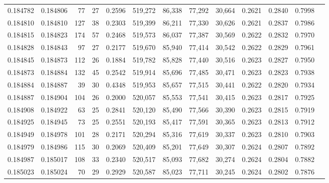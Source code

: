 \begin{tabular}{rrrrrrrrrrrrr}
0.184782 & 0.184806 &    77 &  27 &                                     0.2596 & 519,272 &  86,338 &  77,292 &  30,664 & 0.2621 & 0.2840 & 0.7998 \\
0.184810 & 0.184810 &   127 &  38 &                                     0.2303 & 519,399 &  86,211 &  77,330 &  30,626 & 0.2621 & 0.2837 & 0.7986 \\
0.184815 & 0.184823 &   174 &  57 &                                     0.2468 & 519,573 &  86,037 &  77,387 &  30,569 & 0.2622 & 0.2832 & 0.7970 \\
0.184828 & 0.184843 &    97 &  27 &                                     0.2177 & 519,670 &  85,940 &  77,414 &  30,542 & 0.2622 & 0.2829 & 0.7961 \\
0.184845 & 0.184873 &   112 &  26 &                                     0.1884 & 519,782 &  85,828 &  77,440 &  30,516 & 0.2623 & 0.2827 & 0.7950 \\
0.184873 & 0.184884 &   132 &  45 &                                     0.2542 & 519,914 &  85,696 &  77,485 &  30,471 & 0.2623 & 0.2823 & 0.7938 \\
0.184884 & 0.184887 &    39 &  30 &                                     0.4348 & 519,953 &  85,657 &  77,515 &  30,441 & 0.2622 & 0.2820 & 0.7934 \\
0.184887 & 0.184904 &   104 &  26 &                                     0.2000 & 520,057 &  85,553 &  77,541 &  30,415 & 0.2623 & 0.2817 & 0.7925 \\
0.184908 & 0.184922 &    63 &  25 &                                     0.2841 & 520,120 &  85,490 &  77,566 &  30,390 & 0.2623 & 0.2815 & 0.7919 \\
0.184925 & 0.184945 &    73 &  25 &                                     0.2551 & 520,193 &  85,417 &  77,591 &  30,365 & 0.2623 & 0.2813 & 0.7912 \\
0.184949 & 0.184978 &   101 &  28 &                                     0.2171 & 520,294 &  85,316 &  77,619 &  30,337 & 0.2623 & 0.2810 & 0.7903 \\
0.184979 & 0.184986 &   115 &  30 &                                     0.2069 & 520,409 &  85,201 &  77,649 &  30,307 & 0.2624 & 0.2807 & 0.7892 \\
0.184987 & 0.185017 &   108 &  33 &                                     0.2340 & 520,517 &  85,093 &  77,682 &  30,274 & 0.2624 & 0.2804 & 0.7882 \\
0.185023 & 0.185024 &    70 &  29 &                                     0.2929 & 520,587 &  85,023 &  77,711 &  30,245 & 0.2624 & 0.2802 & 0.7876 \\

\end{tabular}
